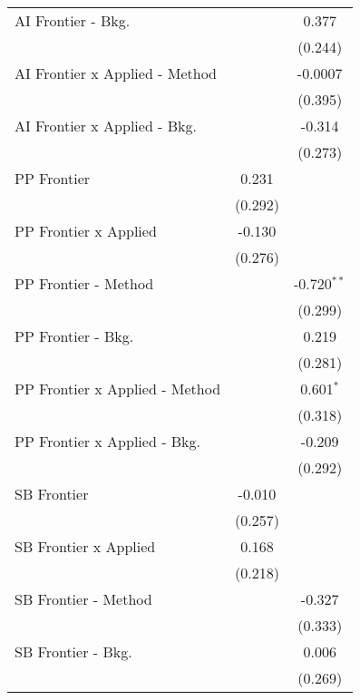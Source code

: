 \begin{tabular}{lcc}
   AI Frontier - Bkg.             &              & 0.377\\   
                                  &              & (0.244)\\   
   AI Frontier x Applied - Method &              & -0.0007\\   
                                  &              & (0.395)\\   
   AI Frontier x Applied - Bkg.   &              & -0.314\\   
                                  &              & (0.273)\\   
   PP Frontier                    & 0.231        &   \\   
                                  & (0.292)      &   \\   
   PP Frontier x Applied          & -0.130       &   \\   
                                  & (0.276)      &   \\   
   PP Frontier - Method           &              & -0.720$^{**}$\\   
                                  &              & (0.299)\\   
   PP Frontier - Bkg.             &              & 0.219\\   
                                  &              & (0.281)\\   
   PP Frontier x Applied - Method &              & 0.601$^{*}$\\   
                                  &              & (0.318)\\   
   PP Frontier x Applied - Bkg.   &              & -0.209\\   
                                  &              & (0.292)\\   
   SB Frontier                    & -0.010       &   \\   
                                  & (0.257)      &   \\   
   SB Frontier x Applied          & 0.168        &   \\   
                                  & (0.218)      &   \\   
   SB Frontier - Method           &              & -0.327\\   
                                  &              & (0.333)\\   
   SB Frontier - Bkg.             &              & 0.006\\   
                                  &              & (0.269)\\   

\end{tabular}
